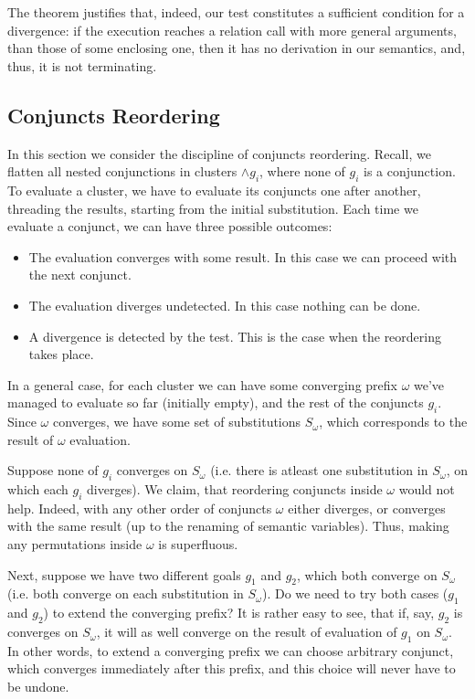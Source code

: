 The theorem justifies that, indeed, our test constitutes a sufficient condition for a divergence: if the execution
reaches a relation call with more general arguments, than those of some enclosing one, then it has no derivation
in our semantics, and, thus, it is not terminating.

\subsection{Conjuncts Reordering}

In this section we consider the discipline of conjuncts reordering. Recall, we flatten all nested conjunctions in 
clusters $\wedge g_i$, where none of $g_i$ is a conjunction. To evaluate a cluster, we have to evaluate
its conjuncts one after another, threading the results, starting from the initial substitution. Each time we
evaluate a conjunct, we can have three possible outcomes:

\begin{itemize}
\item The evaluation converges with some result. In this case we can proceed with the next conjunct.
\item The evaluation diverges undetected. In this case nothing can be done.
\item A divergence is detected by the test. This is the case when the reordering takes place.
\end{itemize}

In a general case, for each cluster we can have some converging prefix $\omega$ we've managed to evaluate so far (initially empty),
and the rest of the conjuncts $g_i$. Since $\omega$ converges, we have some set of substitutions $S_\omega$, which corresponds to the
result of $\omega$ evaluation.

Suppose none of $g_i$ converges on $S_\omega$ (i.e. there is atleast one substitution in $S_\omega$, on which
each $g_i$ diverges). We claim, that reordering conjuncts inside $\omega$ would not help. Indeed, with any other order
of conjuncts $\omega$ either diverges, or converges with the same result (up to the renaming of semantic variables). Thus,
making any permutations inside $\omega$ is superfluous.

Next, suppose we have two different goals $g_1$ and $g_2$, which both converge on $S_\omega$ (i.e. both converge on each
substitution in $S_\omega$). Do we need to try both cases ($g_1$ and $g_2$) to extend the converging prefix?
It is rather easy to see, that if, say, $g_2$ is converges on $S_\omega$, it will as well converge on the result of evaluation
of $g_1$ on $S_\omega$. In other words, to extend a converging prefix we can choose arbitrary conjunct, which converges immediately
after this prefix, and this choice will never have to be undone.

